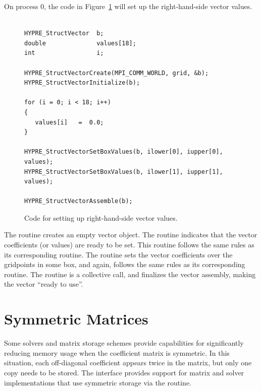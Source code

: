 On process 0, the code in Figure~\ref{fig-struct-rhs} will set up the
right-hand-side vector values.
\begin{figure}
\centering
\begin{minipage}{0.8\textwidth}
\begin{verbatim}

HYPRE_StructVector  b;
double              values[18];
int                 i;

HYPRE_StructVectorCreate(MPI_COMM_WORLD, grid, &b);
HYPRE_StructVectorInitialize(b);

for (i = 0; i < 18; i++)
{
   values[i]   =  0.0;
}

HYPRE_StructVectorSetBoxValues(b, ilower[0], iupper[0], values);
HYPRE_StructVectorSetBoxValues(b, ilower[1], iupper[1], values);

HYPRE_StructVectorAssemble(b);

\end{verbatim}
\end{minipage}
\caption{%
Code for setting up right-hand-side vector values.}
\label{fig-struct-rhs}
\end{figure}
The  routine creates an empty vector object.  The
 routine indicates that the vector coefficients (or values)
are ready to be set.  This routine follows the same rules as its corresponding
 routine.  The  routine sets the vector
coefficients over the gridpoints in some box, and again, follows the same rules
as its corresponding  routine.  The  routine is a
collective call, and finalizes the vector assembly, making the vector ``ready
to use''.


\section{Symmetric Matrices}
\label{sec-Symmetric-Matrices}

Some solvers and matrix storage schemes provide capabilities for
significantly reducing memory usage when the coefficient matrix is
symmetric.  In this situation, each off-diagonal coefficient appears
twice in the matrix, but only one copy needs to be stored.  The
 interface provides support for matrix and solver
implementations that use symmetric storage via the
 routine.

